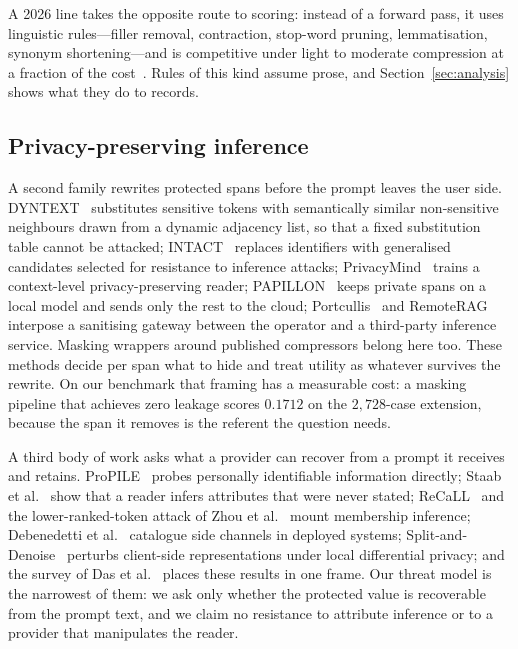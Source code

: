 A 2026 line takes the opposite route to scoring: instead of a forward pass, it uses
linguistic rules---filler removal, contraction, stop-word pruning, lemmatisation,
synonym shortening---and is competitive under light to moderate compression at a
fraction of the cost~\cite{ma-linguistic-2026,chokshi-lexical-2026}. Rules of this
kind assume prose, and Section~\ref{sec:analysis} shows what they do to records.

\subsection{Privacy-preserving inference}
A second family rewrites protected spans before the prompt leaves the user side.
DYNTEXT~\cite{dyntext} substitutes sensitive tokens with semantically similar non-sensitive
neighbours drawn from a dynamic adjacency list, so that a fixed substitution table cannot be
attacked; INTACT~\cite{intact} replaces identifiers with generalised candidates selected for
resistance to inference attacks; PrivacyMind~\cite{xiao-privacymind-2024} trains a
context-level privacy-preserving reader; PAPILLON~\cite{siyan-papillon-2025} keeps private
spans on a local model and sends only the rest to the cloud; Portcullis~\cite{zhan-portcullis-2025}
and RemoteRAG~\cite{cheng-remoterag-2025} interpose a sanitising gateway between the operator
and a third-party inference service. Masking wrappers around published compressors belong
here too. These methods decide per span what to hide and treat utility as whatever survives
the rewrite. On our benchmark that framing has a measurable cost: a masking pipeline that
achieves zero leakage scores $0.1712$ on the $2{,}728$-case extension, because the span it
removes is the referent the question needs.

A third body of work asks what a provider can recover from a prompt it receives and retains.
ProPILE~\cite{kim-propile-2023} probes personally identifiable information directly; Staab et
al.~\cite{staab-beyond-2024} show that a reader infers attributes that were never stated;
ReCaLL~\cite{xie-recall-2024} and the lower-ranked-token attack of Zhou et
al.~\cite{zhou-shadows-2025} mount membership inference; Debenedetti et
al.~\cite{debenedetti-sidechannel-2024} catalogue side channels in deployed systems;
Split-and-Denoise~\cite{mai-splitdenoise-2024} perturbs client-side representations under
local differential privacy; and the survey of Das et al.~\cite{das-survey-2025} places these
results in one frame. Our threat model is the narrowest of them: we ask only whether the
protected value is recoverable from the prompt text, and we claim no resistance to attribute
inference or to a provider that manipulates the reader.

